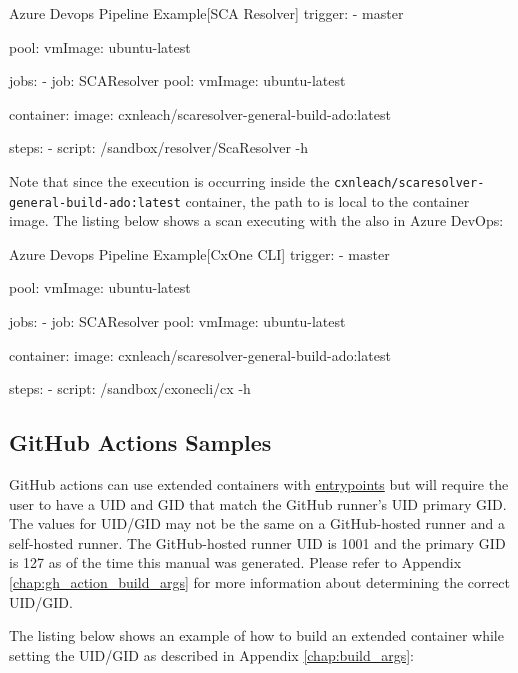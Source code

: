 \label{listing:ado_pipeline2}
\begin{code}{Azure Devops Pipeline Example}{[SCA Resolver]}{}
trigger:
    - master

pool:
    vmImage: ubuntu-latest

jobs:
    - job: SCAResolver
        pool:
            vmImage: ubuntu-latest

        container: 
            image: cxnleach/scaresolver-general-build-ado:latest

        steps:
            - script: /sandbox/resolver/ScaResolver -h
\end{code}

Note that since the execution is occurring inside the
\texttt{cxnleach/scaresolver-general-build-ado:latest} container, the path to \scaresolver
is local to the container image.  The listing below shows a scan executing with the \cxonecli
also in Azure DevOps:\\


\label{listing:ado_pipeline_cxone}
\begin{code}{Azure Devops Pipeline Example}{[CxOne CLI]}{}
trigger:
    - master

pool:
    vmImage: ubuntu-latest

jobs:
    - job: SCAResolver
        pool:
            vmImage: ubuntu-latest

        container: 
            image: cxnleach/scaresolver-general-build-ado:latest

        steps:
            - script: /sandbox/cxonecli/cx -h
\end{code}


\subsection{GitHub Actions Samples}

GitHub actions can use extended containers with \hyperref[ssec:entrypoint_targets]{entrypoints} but
will require the user to have a UID and GID that match the GitHub runner's UID
primary GID.  The values for UID/GID may not be the same on a GitHub-hosted
runner and a self-hosted runner.  The GitHub-hosted runner UID is 1001 and
the primary GID is 127 as of the time this manual was generated. Please
refer to Appendix \ref{chap:gh_action_build_args} for more information
about determining the correct UID/GID.


The listing below shows an example of how to build an extended container while setting the UID/GID as described
in Appendix \ref{chap:build_args}:\\

